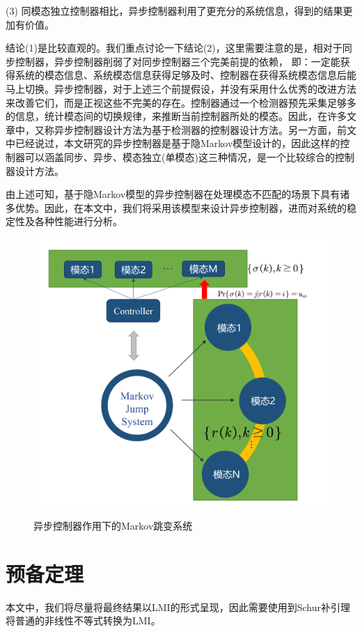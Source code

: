 		(3) 同模态独立控制器相比，异步控制器利用了更充分的系统信息，得到的结果更加有价值。
		
		结论(1)是比较直观的。我们重点讨论一下结论(2)，这里需要注意的是，相对于同步控制器，异步控制器削弱了对同步控制器三个完美前提的依赖， 即：一定能获得系统的模态信息、系统模态信息获得足够及时、控制器在获得系统模态信息后能马上切换。异步控制器，对于上述三个前提假设，并没有采用什么优秀的改进方法来改善它们，而是正视这些不完美的存在。控制器通过一个检测器预先采集足够多的信息，统计模态间的切换规律，来推断当前控制器所处的模态。因此，在许多文章中，又称异步控制器设计方法为基于检测器的控制器设计方法。另一方面，前文中已经说过，本文研究的异步控制器是基于隐Markov模型设计的，因此这样的控制器可以涵盖同步、异步、模态独立(单模态)这三种情况，是一个比较综合的控制器设计方法。
		
		由上述可知，基于隐Markov模型的异步控制器在处理模态不匹配的场景下具有诸多优势。因此，在本文中，我们将采用该模型来设计异步控制器，进而对系统的稳定性及各种性能进行分析。
	
	\begin{figure}[!htb] 
		\centering\includegraphics[scale=0.12]{./figures/introduction/asynsys.png}\\ 
		\caption{异步控制器作用下的Markov跳变系统}
		\label{intro_fig_asynsys}
	\end{figure}
	
\section{预备定理}
	本文中，我们将尽量将最终结果以LMI的形式呈现，因此需要使用到Schur补引理将普通的非线性不等式转换为LMI。
	
